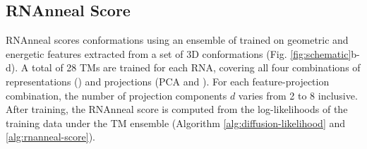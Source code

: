 \documentclass[%
aip,
 amsmath,amssymb,
reprint,%
twocolumn,
]{revtex4-1}
\makeatletter
\newcommand\setcurrentname[1]{\def\@currentlabelname{#1}}
\makeatother
\begin{document}
{%


\subsection*{RNAnneal Score}
\setcurrentname{RNAnneal Score} 
\label{sec:rnanneal}            

RNAnneal scores conformations using an ensemble of  trained on geometric and energetic features extracted from a set of 3D conformations (Fig. \ref{fig:schematic}b-d). A total of 28 TMs are trained for each RNA, covering all four combinations of representations () and projections (PCA and ). For each feature-projection combination, the number of projection components $d$ varies from 2 to 8 inclusive. After training, the RNAnneal score is computed from the log-likelihoods of the training data under the TM ensemble (Algorithm \ref{alg:diffusion-likelihood} and \ref{alg:rnanneal-score}).

}
\end{document}
